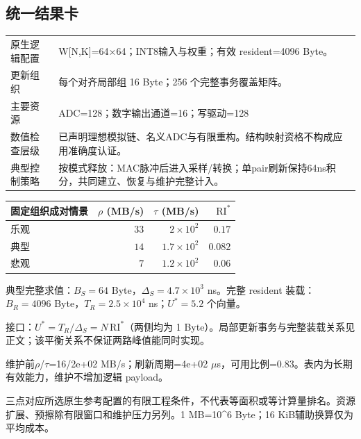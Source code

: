 \subsection*{统一结果卡}
\begingroup\small
\noindent\begin{tabularx}{\textwidth}{@{}p{24mm}X@{}}\toprule
原生逻辑配置 & W[N,K]=64×64；INT8输入与权重；有效 resident=4096 Byte。\\
更新组织 & 每个对齐局部组 16 Byte；256 个完整事务覆盖矩阵。\\
主要资源 & ADC=128；数字输出通道=16；写驱动=128\\
数值检查层级 & 已声明理想模拟链、名义ADC与有限重构。结构映射资格不构成应用准确度认证。\\
典型控制策略 & 按模式释放：MAC脉冲后进入采样/转换；单pair刷新保持64ns积分，共同建立、恢复与维护完整计入。\\
\bottomrule\end{tabularx}
\vspace{3mm}
\begin{center}\begin{tabular}{@{}lrrr@{}}\toprule
固定组织成对情景 & $\rho$ (MB/s) & $\tau$ (MB/s) & $\mathrm{RI}^{*}$\\\midrule
乐观 & $33$ & $2\times10^{2}$ & $0.17$\\
典型 & $14$ & $1.7\times10^{2}$ & $0.082$\\
悲观 & $7$ & $1.2\times10^{2}$ & $0.06$\\
\bottomrule\end{tabular}\end{center}
\noindent 典型完整求值：$B_S=64$ Byte，$\Delta_S=4.7\times10^{3}$ ns。完整 resident 装载：$B_R=4096$ Byte，$T_R=2.5\times10^{4}$ ns；$U^*=5.2$ 个向量。
\par\smallskip\noindent 接口：$U^*=T_R/\Delta_S=N\,\mathrm{RI}^*$（两侧均为 1 Byte）。局部更新事务与完整装载关系见正文；该平衡关系不保证两路峰值能同时实现。
\par\smallskip\noindent 维护前$\rho$/$\tau$=16/2e+02 MB/s；刷新周期=4e+02 $\mu$s，可用比例=0.83。表内为长期有效能力，维护不增加逻辑 payload。
\par\smallskip\noindent 三点对应所选原生参考配置的有限工程条件，不代表等面积或等计算量排名。资源扩展、预擦除有限窗口和维护压力另列。1 MB=10\textasciicircum{}6 Byte；16 KiB辅助换算仅为平均成本。
\endgroup
\clearpage
